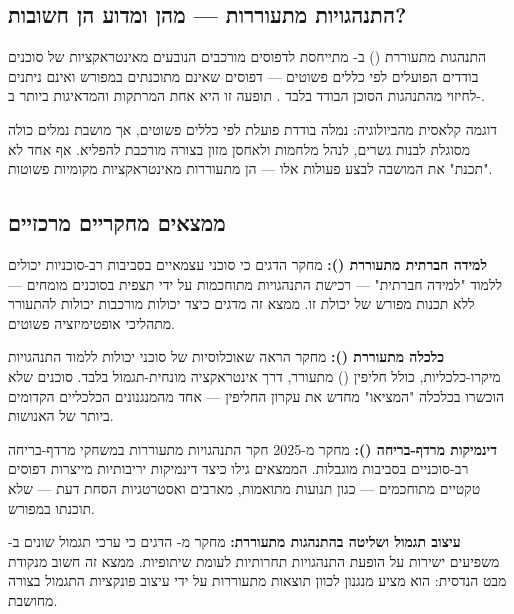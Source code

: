 \documentclass[12pt,a4paper]{article}
\begin{document}
\subsection{התנהגויות מתעוררות — מהן ומדוע הן חשובות?}

התנהגות מתעוררת () ב- מתייחסת לדפוסים מורכבים הנובעים מאינטראקציות של סוכנים בודדים הפועלים לפי כללים פשוטים --- דפוסים שאינם מתוכנתים במפורש ואינם ניתנים לחיזוי מהתנהגות הסוכן הבודד בלבד \cite{Milvus2025}. תופעה זו היא אחת המרתקות והמדאיגות ביותר ב-.

דוגמה קלאסית מהביולוגיה: נמלה בודדת פועלת לפי כללים פשוטים, אך מושבת נמלים כולה מסוגלת לבנות גשרים, לנהל מלחמות ולאחסן מזון בצורה מורכבת להפליא. אף אחד לא "תכנת" את המושבה לבצע פעולות אלו --- הן מתעוררות מאינטראקציות מקומיות פשוטות.

\subsection{ממצאים מחקריים מרכזיים}

\textbf{למידה חברתית מתעוררת ():} מחקר  \cite{GoogleResearch_SocialLearning2021} הדגים כי סוכני  עצמאיים בסביבות רב-סוכניות יכולים ללמוד "למידה חברתית" --- רכישת התנהגויות מתוחכמות על ידי תצפית בסוכנים מומחים --- ללא תכנות מפורש של יכולת זו. ממצא זה מדגים כיצד יכולות מורכבות יכולות להתעורר מתהליכי אופטימיזציה פשוטים.

\textbf{כלכלה מתעוררת ():} מחקר  \cite{DeepMind_Bartering} הראה שאוכלוסיות של סוכני  יכולות ללמוד התנהגויות מיקרו-כלכליות, כולל חליפין () מתעורר, דרך אינטראקציה מונחית-תגמול בלבד. סוכנים שלא הוכשרו בכלכלה "המציאו" מחדש את עקרון החליפין --- אחד מהמנגנונים הכלכליים הקדומים ביותר של האנושות.

\textbf{דינמיקות מרדף-בריחה ():} מחקר  מ-2025 \cite{Nature2025} חקר התנהגויות מתעוררות במשחקי מרדף-בריחה רב-סוכניים בסביבות  מוגבלות. הממצאים גילו כיצד דינמיקות יריבותיות מייצרות דפוסים טקטיים מתוחכמים --- כגון תנועות מתואמות, מארבים ואסטרטגיות הסחת דעת --- שלא תוכנתו במפורש.

\textbf{עיצוב תגמול ושליטה בהתנהגות מתעוררת:} מחקר מ- \cite{SPU2024} הדגים כי ערכי תגמול שונים ב- משפיעים ישירות על הופעת התנהגויות תחרותיות לעומת שיתופיות. ממצא זה חשוב מנקודת מבט הנדסית: הוא מציע מנגנון לכוון תוצאות מתעוררות על ידי עיצוב פונקציות התגמול בצורה מחושבת.
\end{document}
